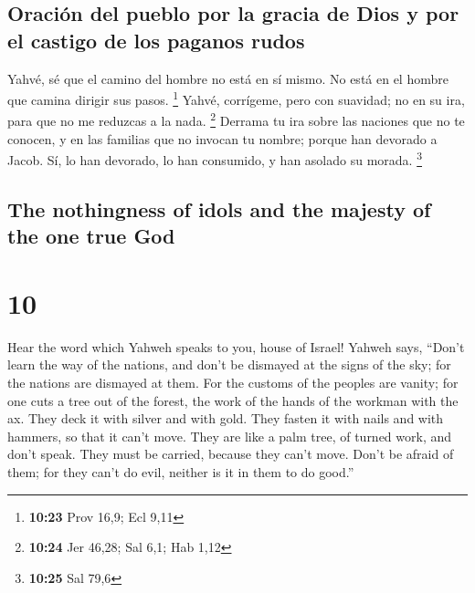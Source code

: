 \begin{paracol}{2}
\hypertarget{oraciuxf3n-del-pueblo-por-la-gracia-de-dios-y-por-el-castigo-de-los-paganos-rudos}{%
\subsection{Oración del pueblo por la gracia de Dios y por el castigo de
los paganos
rudos}\label{oraciuxf3n-del-pueblo-por-la-gracia-de-dios-y-por-el-castigo-de-los-paganos-rudos}}

 Yahvé, sé que el camino del hombre no está en sí mismo.
No está en el hombre que camina dirigir sus pasos. \footnote{\textbf{10:23}
  Prov 16,9; Ecl 9,11}  Yahvé, corrígeme, pero con
suavidad; no en su ira, para que no me reduzcas a la nada. \footnote{\textbf{10:24}
  Jer 46,28; Sal 6,1; Hab 1,12}  Derrama tu ira sobre las
naciones que no te conocen, y en las familias que no invocan tu nombre;
porque han devorado a Jacob. Sí, lo han devorado, lo han consumido, y
han asolado su morada. \footnote{\textbf{10:25} Sal 79,6}

\switchcolumn
\begin{otherlanguage}{english}

\hypertarget{the-nothingness-of-idols-and-the-majesty-of-the-one-true-god}{%
\subsection{The nothingness of idols and the majesty of the one true
God}\label{the-nothingness-of-idols-and-the-majesty-of-the-one-true-god}}

\hypertarget{section-19}{%
\section{10}\label{section-19}}

 Hear the word which Yahweh speaks to you, house of
Israel!  Yahweh says, ``Don't learn the way of the
nations, and don't be dismayed at the signs of the sky; for the nations
are dismayed at them.  For the customs of the peoples are
vanity; for one cuts a tree out of the forest, the work of the hands of
the workman with the ax.  They deck it with silver and
with gold. They fasten it with nails and with hammers, so that it can't
move.  They are like a palm tree, of turned work, and
don't speak. They must be carried, because they can't move. Don't be
afraid of them; for they can't do evil, neither is it in them to do
good.''


\end{otherlanguage}
\end{paracol}
